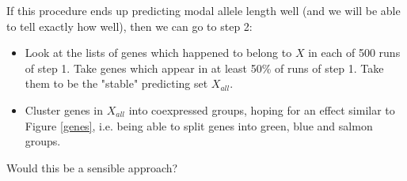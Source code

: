 \documentclass[12pt]{article}
\begin{document}
If this procedure ends up predicting modal allele length well (and we will be able to tell exactly how well), then we can go to step 2:

\begin{itemize}
  \item Look at the lists of genes which happened to belong to $X$ in each of 500 runs of step 1. Take genes which appear in at least 50\% of runs of step 1. Take them to be the "stable" predicting set $X_{all}$.
  \item Cluster genes in $X_{all}$ into coexpressed groups, hoping for an effect similar to Figure \ref{genes}, i.e. being able to split genes into green, blue and salmon groups.
\end{itemize}

Would this be a sensible approach?
\end{document}
